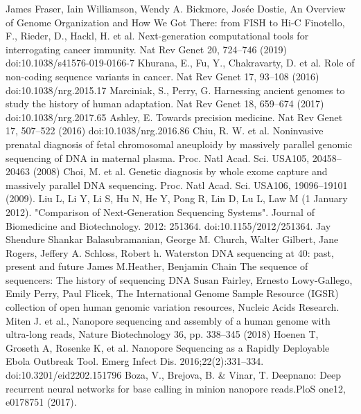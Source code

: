 \documentclass[a4paper,11pt,twoside]{report}
\theoremstyle{definition}
\begin{document}
\begin{thebibliography}{20}%
James Fraser, Iain Williamson, Wendy A. Bickmore,  Josée Dostie, An Overview of Genome Organization and How We Got There: from FISH to Hi-C
Finotello, F., Rieder, D., Hackl, H. et al. Next-generation computational tools for interrogating cancer immunity. Nat Rev Genet 20, 724–746 (2019) doi:10.1038/s41576-019-0166-7
Khurana, E., Fu, Y., Chakravarty, D. et al. Role of non-coding sequence variants in cancer. Nat Rev Genet 17, 93–108 (2016) doi:10.1038/nrg.2015.17
 Marciniak, S., Perry, G. Harnessing ancient genomes to study the history of human adaptation. Nat Rev Genet 18, 659–674 (2017) doi:10.1038/nrg.2017.65
 Ashley, E. Towards precision medicine. Nat Rev Genet 17, 507–522 (2016) doi:10.1038/nrg.2016.86
 Chiu, R. W. et al. Noninvasive prenatal diagnosis of fetal chromosomal aneuploidy by massively parallel genomic sequencing of DNA in maternal plasma. Proc. Natl Acad. Sci. USA105, 20458–20463 (2008)
 Choi, M. et al. Genetic diagnosis by whole exome capture and massively parallel DNA sequencing. Proc. Natl Acad. Sci. USA106, 19096–19101 (2009).
 Liu L, Li Y, Li S, Hu N, He Y, Pong R, Lin D, Lu L, Law M (1 January 2012). "Comparison of Next-Generation Sequencing Systems". Journal of Biomedicine and Biotechnology. 2012: 251364. doi:10.1155/2012/251364.
 Jay Shendure Shankar Balasubramanian, George M. Church, Walter Gilbert, Jane Rogers, Jeffery A. Schloss, Robert h. Waterston DNA sequencing at 40: past, present and future
 James M.Heather, Benjamin Chain The sequence of sequencers: The history of sequencing DNA
 Susan Fairley, Ernesto Lowy-Gallego, Emily Perry, Paul Flicek, The International Genome Sample Resource (IGSR) collection of open human genomic variation resources, Nucleic Acids Research.
 Miten J. et al., Nanopore sequencing and assembly of a human genome with ultra-long reads, Nature Biotechnology 36, pp. 338–345 (2018) 
 Hoenen T, Groseth A, Rosenke K, et al. Nanopore Sequencing as a Rapidly Deployable Ebola Outbreak Tool. Emerg Infect Dis. 2016;22(2):331–334. doi:10.3201/eid2202.151796
Boza, V., Brejova, B. \& Vinar, T. Deepnano: Deep recurrent neural networks for base calling in minion nanopore reads.PloS one12, e0178751 (2017).

\end{thebibliography}
\end{document}
